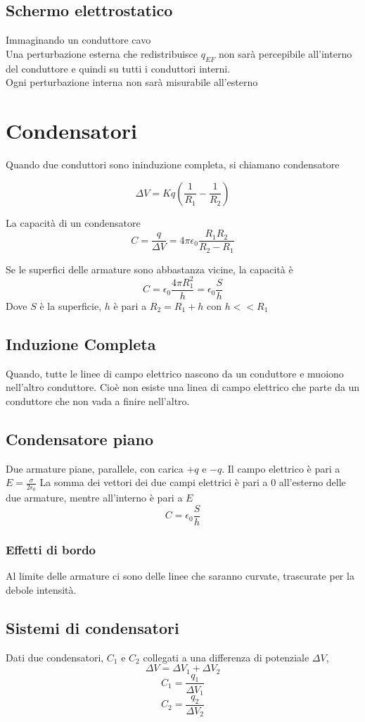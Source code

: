 \documentclass[a4paper]{report}
\begin{document}
  \subsection{Schermo elettrostatico}
  Immaginando un conduttore cavo\\
  Una perturbazione esterna che redistribuisce $q_{EF}$ non sarà percepibile all'interno del conduttore e quindi su tutti i conduttori interni.\\
  Ogni perturbazione interna non sarà misurabile all'esterno

  \section{Condensatori}
  Quando due conduttori sono ininduzione completa, si chiamano condensatore

  \[ \Delta V = Kq (\frac{1}{R_1} - \frac{1}{R_2}) \]

  La capacità di un condensatore
  \[ C= \frac{q}{\Delta V} = 4 \pi \epsilon_0 \frac{R_1 R_2}{R_2 - R_1} \]

  Se le superfici delle armature sono abbastanza vicine, la capacità è
  \[C = \epsilon_0 \frac{4 \pi R_1^2}{h} = \epsilon_0 \frac{S}{h}\]
  Dove $S$ è la superficie, $h$ è pari a $R_2 = R_1 + h$ con $h<<R_1$

  \subsection{Induzione Completa}
  Quando, tutte le linee di campo elettrico nascono da un conduttore e muoiono nell'altro conduttore. Cioè non esiste una linea di campo elettrico che parte da un conduttore che non vada a finire nell'altro.

  \subsection{Condensatore piano}
  Due armature piane, parallele, con carica $+q$ e $-q$.
  Il campo elettrico è pari a \( E = \frac{\sigma}{2\epsilon_0} \)
  La somma dei vettori dei due campi elettrici è pari a $0$ all'esterno delle due armature, mentre all'interno è pari a $E$
  \[ C = \epsilon_0 \frac{S}{h} \]
  \subsubsection{Effetti di bordo}
  Al limite delle armature ci sono delle linee che saranno curvate, trascurate per la debole intensità.
  \subsection{Sistemi di condensatori}
  Dati due condensatori, $C_1$ e $C_2$ collegati a una differenza di potenziale $\Delta V$,
  \[ \Delta V = \Delta V_1 + \Delta V_2 \]
  \[ C_1 = \frac{q_1}{\Delta V_1} \]
  \[ C_2 = \frac{q_2}{\Delta V_2} \]
\end{document}
